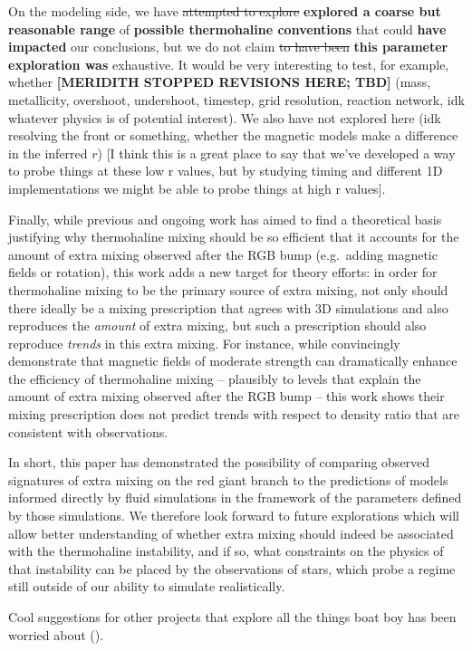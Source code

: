 On the modeling side, we have \sout{attempted to explore} \textbf{explored a coarse but reasonable range} of \textbf{possible thermohaline conventions} that could \textbf{have impacted} our conclusions, but we do not claim \sout{to have been} \textbf{this parameter exploration was} exhaustive. It would be very interesting to test, for example, whether 
\textbf{[MERIDITH STOPPED REVISIONS HERE; TBD]}
(mass, metallicity, overshoot, undershoot, timestep, grid resolution, reaction network, idk whatever physics is of potential interest). We also have not explored here (idk resolving the front or something, whether the magnetic models make a difference in the inferred $r$) [I think this is a great place to say that we've developed a way to probe things at these low r values, but by studying timing and different 1D implementations we might be able to probe things at high r values].

Finally, while previous and ongoing work has aimed to find a theoretical basis justifying why thermohaline mixing should be so efficient that it accounts for the amount of extra mixing observed after the RGB bump (e.g.~adding magnetic fields or rotation), this work adds a new target for theory efforts: in order for thermohaline mixing to be the primary source of extra mixing, not only should there ideally be a mixing prescription that agrees with 3D simulations and also reproduces the \textit{amount} of extra mixing, but such a prescription should also reproduce \textit{trends} in this extra mixing.
For instance, while \citet{harrington} convincingly demonstrate that magnetic fields of moderate strength can dramatically enhance the efficiency of thermohaline mixing -- plausibly to levels that explain the amount of extra mixing observed after the RGB bump -- this work shows their mixing prescription does not predict trends with respect to density ratio that are consistent with observations.

In short, this paper has demonstrated the possibility of comparing observed signatures of extra mixing on the red giant branch to the predictions of models informed directly by fluid simulations in the framework of the parameters defined by those simulations. We therefore look forward to future explorations which will allow better understanding of whether extra mixing should indeed be associated with the thermohaline instability, and if so, what constraints on the physics of that instability can be placed by the observations of stars, which probe a regime still outside of our ability to simulate realistically.
    
    

    
    
    Cool suggestions for other projects that explore all the things boat boy has been worried about (\partyparrot).

